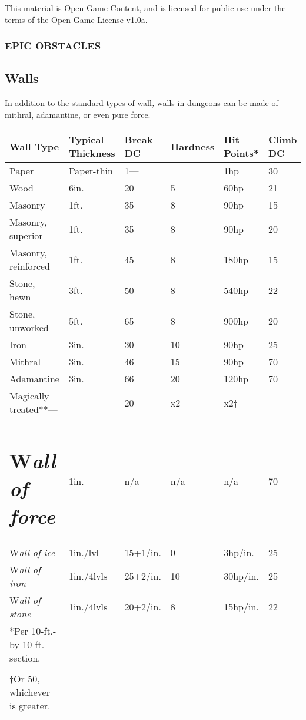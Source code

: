 \documentclass{article}
\begin{document}
This material is Open Game Content, and is licensed for public use under the terms 
of the Open Game License v1.0a.

\subsubsection*{{\LARGE{}EPIC OBSTACLES}}

\vspace{12pt}
\subsection*{Walls}

In addition to the standard types of wall\textit{, }walls in dungeons can be made 
of mithral, adamantine, or even pure force.

\begin{tabular}{|>{\raggedright}p{94pt}|>{\raggedright}p{59pt}|>{\raggedright}p{29pt}|>{\raggedright}p{26pt}|>{\raggedright}p{33pt}|>{\raggedright}p{29pt}|}
\hline
W\textbf{all Type} & T\textbf{ypical Thickness} & B\textbf{reak DC} & H\textbf{ardness} & H\textbf{it 
Points*} & C\textbf{limb DC}\tabularnewline
\hline
Paper & Paper-thin & 1--- &  & 1hp & 30\tabularnewline
\hline
Wood & 6in. & 20 & 5 & 60hp & 21\tabularnewline
\hline
Masonry & 1ft. & 35 & 8 & 90hp & 15\tabularnewline
\hline
Masonry, superior & 1ft. & 35 & 8 & 90hp & 20\tabularnewline
\hline
Masonry, reinforced & 1ft. & 45 & 8 & 180hp & 15\tabularnewline
\hline
Stone, hewn & 3ft. & 50 & 8 & 540hp & 22\tabularnewline
\hline
Stone, unworked & 5ft. & 65 & 8 & 900hp & 20\tabularnewline
\hline
Iron & 3in. & 30 & 10 & 90hp & 25\tabularnewline
\hline
Mithral & 3in. & 46 & 15 & 90hp & 70\tabularnewline
\hline
Adamantine & 3in. & 66 & 20 & 120hp & 70\tabularnewline
\hline
Magically treated**--- &  & 20 & x2 & x2†--- & \tabularnewline
\hline
\section*{W\textit{all of force}} & 1in. & n/a & n/a & n/a & 70\tabularnewline
\hline
W\textit{all of ice} & 1in./lvl & 15+1/in. & 0 & 3hp/in. & 25\tabularnewline
\hline
W\textit{all of iron} & 1in./4lvls & 25+2/in. & 10 & 30hp/in. & 25\tabularnewline
\hline
W\textit{all of stone} & 1in./4lvls & 20+2/in. & 8 & 15hp/in. & 22\tabularnewline
\hline
*Per 10-ft.-by-10-ft. section.  &  &  &  &  & \tabularnewline
\hline
\multicolumn{6}{|p{273pt}|}{**These modifiers can be applied to any of the other 
categories and types. }\tabularnewline
\hline
†Or 50, whichever is greater. &  &  &  &  & \tabularnewline
\hline
\end{tabular} 
\end{document}

